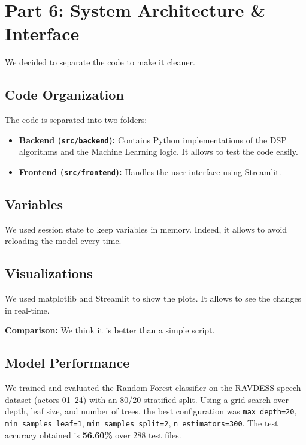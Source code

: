 \documentclass[12pt,letterpaper]{article}
\begin{document}
\section{Part 6: System Architecture \& Interface}
We decided to separate the code to make it cleaner.

\subsection{Code Organization}
The code is separated into two folders:
\begin{itemize}
    \item \textbf{Backend (\texttt{src/backend}):} Contains Python implementations of the DSP algorithms and the Machine Learning logic. It allows to test the code easily.
    \item \textbf{Frontend (\texttt{src/frontend}):} Handles the user interface using Streamlit.
\end{itemize}

\subsection{Variables}
We used session state to keep variables in memory. Indeed, it allows to avoid reloading the model every time.

\subsection{Visualizations}
We used matplotlib and Streamlit to show the plots. It allows to see the changes in real-time.

\textbf{Comparison:} We think it is better than a simple script.

\subsection{Model Performance}
We trained and evaluated the Random Forest classifier on the RAVDESS speech dataset (actors 01--24) with an 80/20 stratified split. Using a grid search over depth, leaf size, and number of trees, the best configuration was \texttt{max\_depth=20}, \texttt{min\_samples\_leaf=1}, \texttt{min\_samples\_split=2}, \texttt{n\_estimators=300}. The test accuracy obtained is \textbf{56.60\%} over 288 test files.
\end{document}
